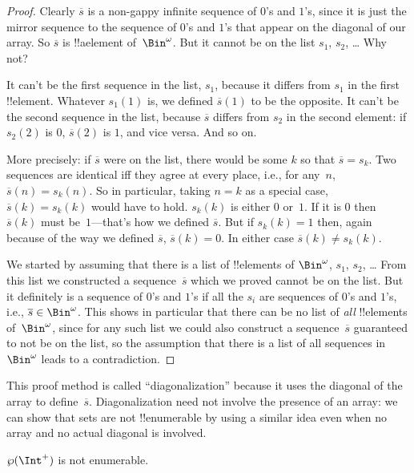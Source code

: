 \documentclass[../../../include/open-logic-section]{subfiles}
\begin{document}
\begin{proof}
Clearly $\overline{s}$ is a non-gappy infinite sequence of $0$'s and
$1$'s, since it is just the mirror sequence to the sequence of $0$'s
and $1$'s that appear on the diagonal of our array.  So $\overline{s}$
is !!a{element} of~$\Bin^\omega$.  But it cannot be on the list $s_1$,
$s_2$, \dots{} Why not?

It can't be the first sequence in the list, $s_1$, because it differs from
$s_1$ in the first !!{element}.  Whatever $s_1(1)$ is, we defined
$\overline{s}(1)$ to be the opposite.  It can't be the second
sequence in the list, because $\overline{s}$ differs from $s_2$ in the second
element: if $s_2(2)$ is $0$, $\overline{s}(2)$ is $1$, and vice
versa. And so on.

More precisely: if $\overline{s}$ were on the list, there would be
some $k$ so that $\overline{s} = s_{k}$.  Two sequences are identical
iff they agree at every place, i.e., for any~$n$, $\overline{s}(n) =
s_{k}(n)$.  So in particular, taking $n = k$ as a special case,
$\overline{s}(k) = s_{k}(k)$ would have to hold. $s_k(k)$ is either
$0$ or~$1$. If it is $0$ then $\overline{s}(k)$ must be~$1$---that's
how we defined $\overline{s}$. But if $s_k(k) = 1$ then, again because
of the way we defined $\overline{s}$, $\overline{s}(k) = 0$. In either
case $\overline{s}(k) \neq s_{k}(k)$.

We started by assuming that there is a list of !!{element}s of
$\Bin^\omega$, $s_1$, $s_2$, \dots{} From this list we constructed a
sequence~$\overline{s}$ which we proved cannot be on the list.  But it
definitely is a sequence of $0$'s and $1$'s if all the $s_i$ are
sequences of $0$'s and $1$'s, i.e., $\overline{s} \in
\Bin^\omega$. This shows in particular that there can be no list of
\emph{all} !!{element}s of~$\Bin^\omega$, since for any such list we
could also construct a sequence~$\overline{s}$ guaranteed to not be on
the list, so the assumption that there is a list of all sequences
in~$\Bin^\omega$ leads to a contradiction.
\end{proof}

\begin{explain}
This proof method is called ``diagonalization'' because it uses the
diagonal of the array to define~$\overline{s}$. Diagonalization need
not involve the presence of an array: we can show that sets are not
!!{enumerable} by using a similar idea even when no array and no
actual diagonal is involved.
\end{explain}

\begin{thm}
$\Pow{\Int^+}$ is not enumerable.
\end{thm}
\end{document}
